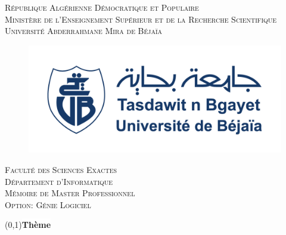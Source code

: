 
%
%
%
%
%

\begin{titlepage}




\begin{center}
	\scshape{{ République Algérienne Démocratique et Populaire}}\\
	\scshape{{Ministère de l'Enseignement Supérieur et de la Recherche Scientifique}}\\
	\scshape{{\large Université Abderrahmane Mira de Béjaïa}}
	
	\begin{figure}[H]
		\centering
		\includegraphics[width=0.4\linewidth]{pagedegarde/Logo_Univ_Bejaia}
		\label{fig:Logo_Univ_Bejaia}
	\end{figure}
	\scshape{{Faculté des Sciences Exactes}}\\
	\scshape{{Département d'Informatique}}\\\medskip
	\scshape{{\large Mémoire de Master Professionnel}}\\\medskip
	\scshape{\large{Option: }{\Large Génie Logiciel}}
\end{center}
\vspace{1cm}



\boxput*(0,1){\colorbox{white}{\textbf{{\large Thème}}}}
{\setlength{\fboxsep}{25pt}
}


\end{titlepage}
